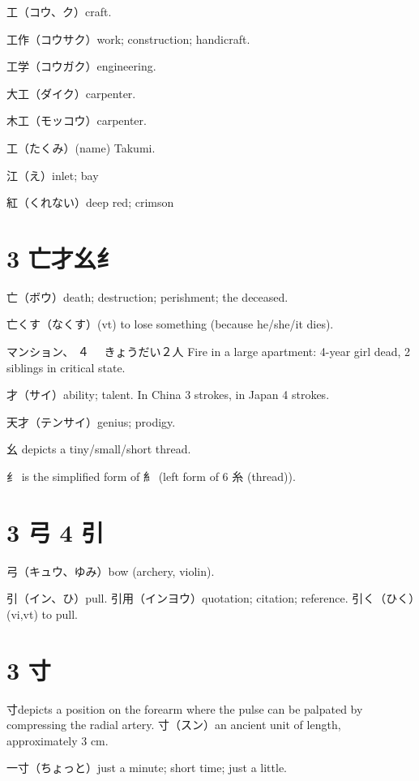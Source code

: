 工（コウ、ク）craft.

工作（コウサク）work; construction; handicraft.

工学（コウガク）engineering.

大工（ダイク）carpenter.

木工（モッコウ）carpenter.

工（たくみ）(name) Takumi.

江（え）inlet; bay

紅（くれない）deep red; crimson

\section{3 亡才幺纟}

亡（ボウ）death; destruction; perishment; the deceased.

亡くす（なくす）(vt) to lose something (because he/she/it dies).

マンション、%
４%
　きょうだい２人
Fire in a large apartment: 4-year girl dead, 2 siblings in critical state.

才（サイ）ability; talent.
In China 3 strokes, in Japan 4 strokes.

天才（テンサイ）genius; prodigy.

幺 depicts a tiny/small/short thread.

纟 is the simplified form of 糹
(left form of 6 糸 (thread)).

\section{3 弓 4 引}

弓（キュウ、ゆみ）bow (archery, violin).

引（イン、ひ）pull.
引用（インヨウ）quotation; citation; reference.
引く（ひく）(vi,vt) to pull.

\section{3 寸}

寸depicts a position on the forearm
where the pulse can be palpated by compressing the radial artery.
寸（スン）an ancient unit of length, approximately 3 cm.

一寸（ちょっと）just a minute; short time; just a little.


